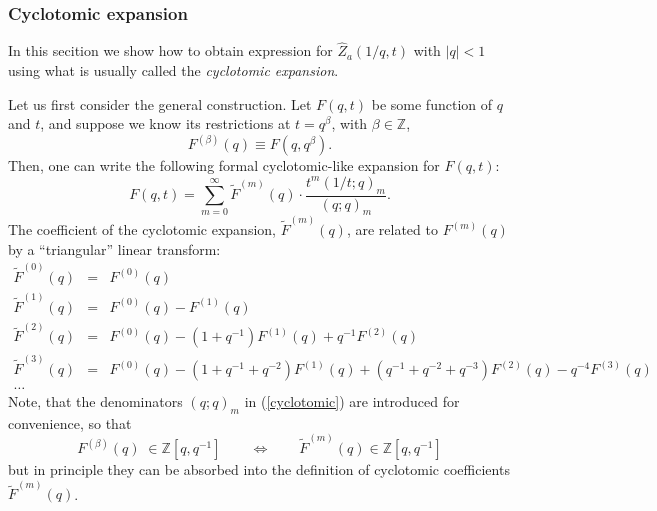 \documentclass[hyper,letterpaper]{JHEP3}
\newcommand{\Z}{{\mathbb Z}}
\def\tilde{\widetilde}
\renewcommand{\hat}{\widehat}
\begin{document}
\subsubsection{Cyclotomic expansion}
\label{sec:cyclotomic}

In this secition we show how to obtain expression for $\hat{Z}_a(1/q,t)$ with $|q|<1$ using what is usually called the \textit{cyclotomic expansion}.

Let us first consider the general construction. Let $F(q,t)$ be some function of $q$ and $t$,
and suppose we know its restrictions at $t=q^\beta$, with $\beta\in\Z$,
\begin{equation}
	F^{(\beta)}(q)\equiv F(q,q^\beta).
\end{equation}
Then, one can write the following formal cyclotomic-like expansion for $F(q,t)$:
\begin{equation}
	F(q,t)=\sum_{m=0}^\infty\tilde{F}^{(m)}(q)\cdot\frac{t^m(1/t;q)_m}{(q;q)_m}.
	\label{cyclotomic}
\end{equation}
The coefficient of the cyclotomic expansion, $\tilde{F}^{(m)}(q)$, are  related to ${F}^{(m)}(q)$ by a ``triangular'' linear transform:
\begin{equation}
	\begin{array}{rcl}
		\tilde{F}^{(0)}(q) & = & F^{(0)}(q)\\
		\tilde{F}^{(1)}(q) & = & F^{(0)}(q)-F^{(1)}(q)\\
		\tilde{F}^{(2)}(q) & = & F^{(0)}(q)-(1+q^{-1})F^{(1)}(q)+q^{-1}F^{(2)}(q)\\
		\tilde{F}^{(3)}(q) & = & F^{(0)}(q)-(1+q^{-1}+q^{-2})F^{(1)}(q)
		+(q^{-1}+q^{-2}+q^{-3})F^{(2)}(q)-q^{-4}F^{(3)}(q)\\
		\ldots
	\end{array}
	\label{Cyc-transform}
\end{equation}
Note, that the denominators $(q;q)_m$ in (\ref{cyclotomic}) are introduced for convenience, so that
\begin{equation}
	F^{(\beta)}(q)\;\in\Z[q,q^{-1}]\qquad\Longleftrightarrow \qquad\tilde{F}^{(m)}(q) \in\Z[q,q^{-1}]
\end{equation}
but in principle they can be absorbed into the definition of cyclotomic coefficients $\tilde{F}^{(m)}(q)$.
\end{document}
